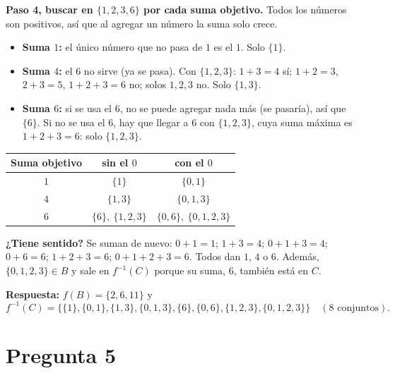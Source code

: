 \documentclass[11pt]{article}
\begin{document}
\begin{explica}
\textbf{Paso 4, buscar en $\{1,2,3,6\}$ por cada suma objetivo.} Todos los números son positivos, así que al agregar un número la suma solo crece.
\begin{itemize}[leftmargin=1.3em,itemsep=2pt]
\item \textbf{Suma $1$:} el único número que no pasa de $1$ es el $1$. Solo $\{1\}$.
\item \textbf{Suma $4$:} el $6$ no sirve (ya se pasa). Con $\{1,2,3\}$: $1+3=4$ sí; $1+2=3$, $2+3=5$, $1+2+3=6$ no; solos $1,2,3$ no. Solo $\{1,3\}$.
\item \textbf{Suma $6$:} si se usa el $6$, no se puede agregar nada más (se pasaría), así que $\{6\}$. Si no se usa el $6$, hay que llegar a $6$ con $\{1,2,3\}$, cuya suma máxima es $1+2+3=6$: solo $\{1,2,3\}$.
\end{itemize}
\begin{center}
\renewcommand{\arraystretch}{1.35}
\begin{tabular}{|c|c|c|}
\hline
\textbf{Suma objetivo} & \textbf{sin el $0$} & \textbf{con el $0$} \\ \hline
$1$ & $\{1\}$ & $\{0,1\}$ \\ \hline
$4$ & $\{1,3\}$ & $\{0,1,3\}$ \\ \hline
$6$ & $\{6\},\ \{1,2,3\}$ & $\{0,6\},\ \{0,1,2,3\}$ \\ \hline
\end{tabular}
\end{center}
\textbf{¿Tiene sentido?} Se suman de nuevo: $0+1=1$; $1+3=4$; $0+1+3=4$; $0+6=6$; $1+2+3=6$; $0+1+2+3=6$. Todos dan $1$, $4$ o $6$. Además, $\{0,1,2,3\}\in B$ y sale en $f^{-1}(C)$ porque su suma, $6$, también está en $C$.
\end{explica}


\textbf{Respuesta:} $f(B)=\{2,6,11\}$ y
\[f^{-1}(C)=\big\{\{1\},\{0,1\},\{1,3\},\{0,1,3\},\{6\},\{0,6\},\{1,2,3\},\{0,1,2,3\}\big\}\quad(8\text{ conjuntos}).\]

\clearpage
\section*{Pregunta 5}
\end{document}

